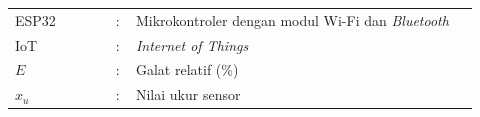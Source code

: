\begin{daftarisi}\end{daftarisi}
\begin{daftartabel}\end{daftartabel}
\begin{daftargambar}\end{daftargambar}
\begin{daftarlampiran}\end{daftarlampiran}
\begin{singlespace}
\begin{longtable}{@{}p{0.2\linewidth}p{0.04\linewidth}p{0.68\linewidth}@{}}
ESP32 & : & Mikrokontroler dengan modul Wi-Fi dan \textit{Bluetooth} \\[3pt]
IoT & : & \textit{Internet of Things} \\[3pt]
$E$ & : & Galat relatif (\%) \\[3pt]
$x_{u}$ & : & Nilai ukur sensor \\
\end{longtable}
\end{singlespace}
\begin{akhirdepan}\end{akhirdepan}
\pagestyle{isi}

